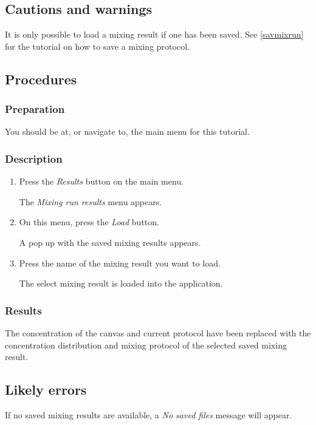 \subsection{Cautions and warnings}
It is only possible to load a mixing result if one has been saved. See \ref{savmixrun} for the tutorial on how to save a mixing protocol.

\subsection{Procedures}
\subsubsection{Preparation}
You should be at, or navigate to, the main menu for this tutorial.

\subsubsection{Description}

\begin{enumerate}
	\item Press the \emph{Results} button on the main menu. 
		\begin{itemize}
            The \emph{Mixing run results} menu appears.
		\end{itemize}
	\item On this menu, press the \emph{Load} button. 
		\begin{itemize}
            A pop up with the saved mixing results appears.
		\end{itemize}
	\item  Press the name of the mixing result you want to load.
		\begin{itemize}
            The select mixing result is loaded into the application.
		\end{itemize}
\end{enumerate}

\subsubsection{Results}
The concentration of the canvas and current protocol have been replaced with the concentration distribution and mixing protocol of the selected saved mixing result.

\subsection{Likely errors}
If no saved mixing results are available, a \emph{No saved files} message will appear.

